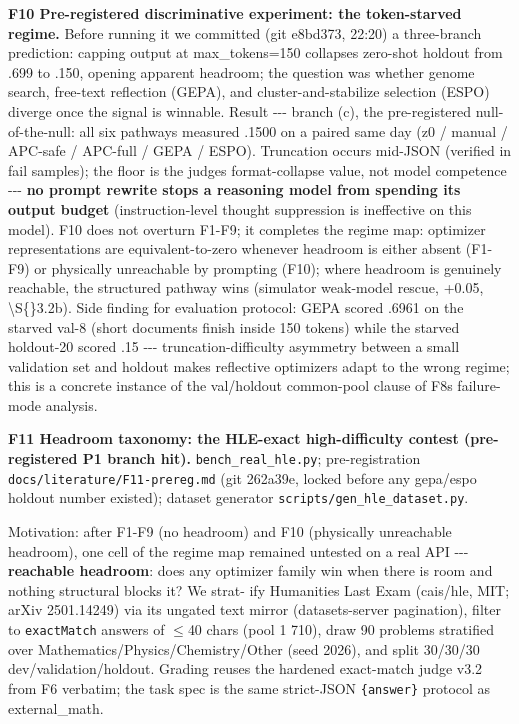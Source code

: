 \textbf{F10 Pre-registered discriminative experiment: the token-starved regime.} Before running it we committed (git e8bd373, 22:20) a three-branch prediction: capping output at max\_tokens=150 collapses zero-shot holdout from .699 to .150, opening apparent headroom; the question was whether genome search, free-text reflection (GEPA), and cluster-and-stabilize selection (ESPO) diverge once the signal is winnable. Result -\/-\/- branch (c), the pre-registered null-of-the-null: all six pathways measured .1500 on a paired same day (z0 / manual / APC-safe / APC-full / GEPA / ESPO). Truncation occurs mid-JSON (verified in fail samples); the floor is the judge\textquotesingle s format-collapse value, not model competence -\/-\/- \textbf{no prompt rewrite stops a reasoning model from spending its output budget} (instruction-level thought suppression is ineffective on this model). F10 does not overturn F1-F9; it completes the regime map: optimizer representations are equivalent-to-zero whenever headroom is either absent (F1-F9) or physically unreachable by prompting (F10); where headroom is genuinely reachable, the structured pathway wins (simulator weak-model rescue, +0.05, \textbackslash S\{\}3.2b). Side finding for evaluation protocol: GEPA scored .6961 on the starved val-8 (short documents finish inside 150 tokens) while the starved holdout-20 scored .15 -\/-\/- truncation-difficulty asymmetry between a small validation set and holdout makes reflective optimizers adapt to the wrong regime; this is a concrete instance of the val/holdout common-pool clause of F8\textquotesingle s failure-mode analysis.

\textbf{F11 Headroom taxonomy: the HLE-exact high-difficulty contest (pre-registered P1 branch hit).} \texttt{bench\_real\_hle.py}; pre-registration \texttt{docs/literature/F11-prereg.md} (git 262a39e, locked before any gepa/espo holdout number existed); dataset generator \texttt{scripts/gen\_hle\_dataset.py}.

Motivation: after F1-F9 (no headroom) and F10 (physically unreachable headroom), one cell of the regime map remained untested on a real API -\/-\/- \textbf{reachable headroom}: does any optimizer family win when there is room and nothing structural blocks it? We strat- ify Humanities\textquotesingle{} Last Exam (cais/hle, MIT; arXiv 2501.14249) via its ungated text mirror (datasets-server pagination), filter to \texttt{exactMatch} answers of \(\leq\)40 chars (pool 1 710), draw 90 problems stratified over Mathematics/Physics/Chemistry/Other (seed 2026), and split 30/30/30 dev/validation/holdout. Grading reuses the hardened exact-match judge v3.2 from F6 verbatim; the task spec is the same strict-JSON \texttt{\{answer\}} protocol as external\_math.


